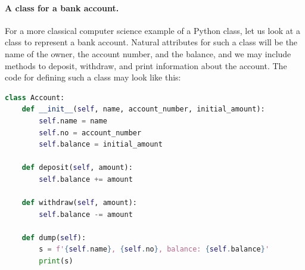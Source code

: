 \documentclass[graybox,envcountchap,sectrefs,final]{svmonodo}
\begin{document}
\paragraph{A class for a bank account.}
For a more classical computer science example of a Python class, let us look at a class to represent a bank account. Natural
attributes for such a class will be the name of the owner, the account number, and the balance, and we may include methods
to deposit, withdraw, and print information about the account. The code for defining such a class may look like this:
\begin{lstlisting}[language=Python,style=blue1]
class Account:
    def __init__(self, name, account_number, initial_amount):
        self.name = name
        self.no = account_number
        self.balance = initial_amount

    def deposit(self, amount):
        self.balance += amount

    def withdraw(self, amount):
        self.balance -= amount

    def dump(self):
        s = f'{self.name}, {self.no}, balance: {self.balance}'
        print(s)
\end{lstlisting}
\end{document}
